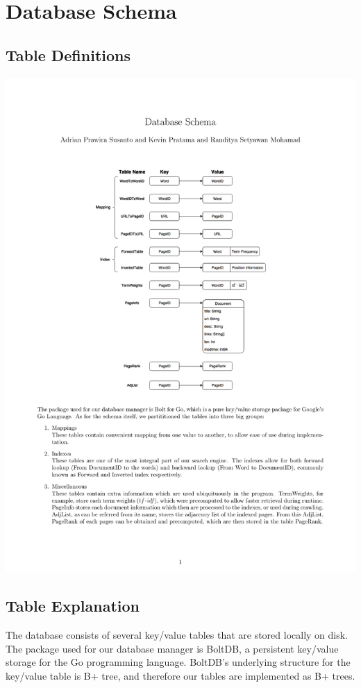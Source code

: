 \documentclass[12pt,a4paper]{article}
\begin{document}
    \section*{Database Schema}
    \subsection*{Table Definitions}
    \begin{center}
        \includegraphics[scale=0.8]{databaseSchema} \\
    \end{center}

    \subsection*{Table Explanation}
    The database consists of several key/value tables that are stored locally on disk.
    The package used for our database manager is BoltDB, a persistent key/value storage for the Go programming language.
    BoltDB's underlying structure for the key/value table is B+ tree, and therefore our tables are implemented as B+ trees.
\end{document}
